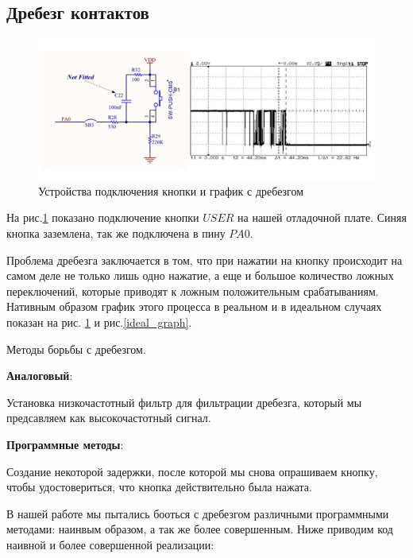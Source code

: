 \subsection{Дребезг контактов}


\begin{figure}[h!]
		\centering
		\includegraphics[width=1\linewidth]{pics/drebezg.png}
		\caption{Устройства подключения кнопки и график с дребезгом}
		\label{drebezg}
\end{figure}

На рис.\ref{drebezg} показано подключение кнопки $USER$ на нашей отладочной плате.
Синяя кнопка заземлена, так же подключена в пину $PA0$. 
	
	
Проблема дребезга заключается в том, что при нажатии на кнопку происходит на самом деле не только лишь одно нажатие, а еще и большое количество ложных переключений, которые приводят к ложным положительным срабатываниям. Нативным образом график этого процесса в реальном и в идеальном случаях показан на рис. \ref{drebezg} и рис.\ref{ideal_graph}.

Методы борьбы с дребезгом.

\textbf{Аналоговый}:

Установка низкочастотный фильтр для фильтрации дребезга, который мы предсавляем как высокочастотный сигнал.

\textbf{Программные методы}:

Создание некоторой задержки, после которой мы снова опрашиваем кнопку, чтобы удостовериться, что кнопка действительно была нажата.


В нашей работе мы пытались бооться с дребезгом различными программными методами: наинвым образом, а так же более совершенным. Ниже приводим код наивной и более совершенной реализации:

